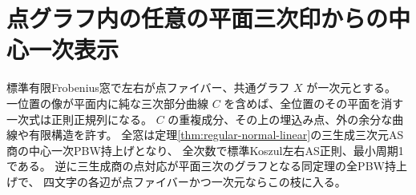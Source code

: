 \section{点グラフ内の任意の平面三次印からの中心一次表示}
\label{sec:plane-cubic-mark-normality}
\begin{theorem}\label{thm:plane-cubic-mark-normality}
標準有限Frobenius窓で左右が点ファイバー、共通グラフ $X$ が一次元とする。
一位置の像が平面内に純な三次部分曲線 $C$ を含めば、全位置のその平面を消す一次式は正則正規列になる。
$C$ の重複成分、その上の埋込み点、外の余分な曲線や有限構造を許す。
全窓は定理\ref{thm:regular-normal-linear}の三生成三次元AS商の中心一次PBW持上げとなり、
全次数で標準Koszul左右AS正則、最小周期1である。
逆に三生成商の点対応が平面三次のグラフとなる同定理の全PBW持上げで、
四文字の各辺が点ファイバーかつ一次元ならこの枝に入る。
\end{theorem}
